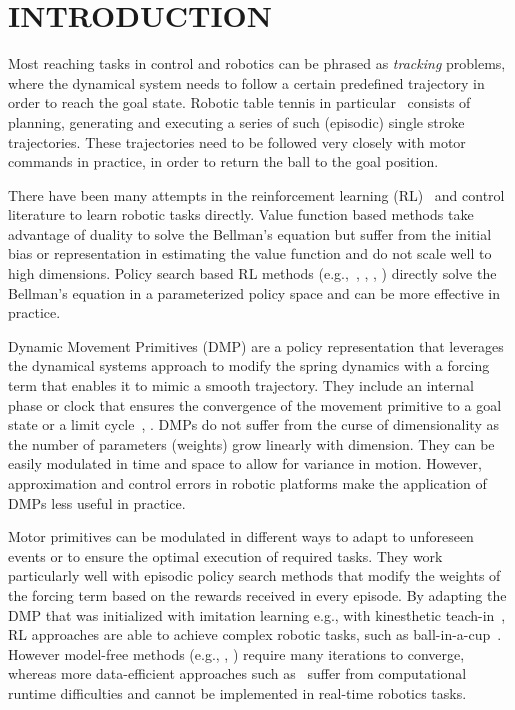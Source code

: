 \section{INTRODUCTION}\label{introduction}


Most reaching tasks in control and robotics can be phrased as \emph{tracking} problems, where the dynamical system needs to follow a certain predefined trajectory in order to reach the goal state. Robotic table tennis in particular~\cite{Muelling13} consists of planning, generating and executing a series of such (episodic) single stroke trajectories. These trajectories need to be followed very closely with motor commands in practice, in order to return the ball to the goal position. 

There have been many attempts in the reinforcement learning (RL)~\cite{Sutton98} and control literature to learn robotic tasks directly. Value function based methods take advantage of duality to solve the Bellman's equation but suffer from the initial bias or representation in estimating the value function and do not scale well to high dimensions. Policy search based RL methods (e.g.,~\cite{Kober08}, \cite{Peter10}, \cite{Theodorou10}, \cite{Deisenroth11}) directly solve the Bellman's equation in a parameterized policy space and can be more effective in practice. 

Dynamic Movement Primitives (DMP) are a policy representation that leverages the dynamical systems approach to modify the spring dynamics with a forcing term that enables it to mimic a smooth trajectory. They include an internal phase or clock that ensures the convergence of the movement primitive to a goal state or a limit cycle~\cite{Ijspeert13}, \cite{Schaal07}. DMPs do not suffer from the curse of dimensionality as the number of parameters (weights) grow linearly with dimension. They can be easily modulated in time and space to allow for variance in motion. However, approximation and control errors in robotic platforms make the application of DMPs less useful in practice. %

Motor primitives can be modulated in different ways to adapt to unforeseen events or to ensure the optimal execution of required tasks. They work particularly well with episodic policy search methods that modify the weights of the forcing term based on the rewards received in every episode. By adapting the DMP that was initialized with imitation learning e.g., with kinesthetic teach-in~\cite{Muelling13}, RL approaches are able to achieve complex robotic tasks, such as ball-in-a-cup~\cite{Kober09}. However model-free methods (e.g., \cite{Kober08}, \cite{Peter10}) require many iterations to converge, whereas more data-efficient approaches such as~\cite{Deisenroth11} suffer from computational runtime difficulties and cannot be implemented in real-time robotics tasks. %

